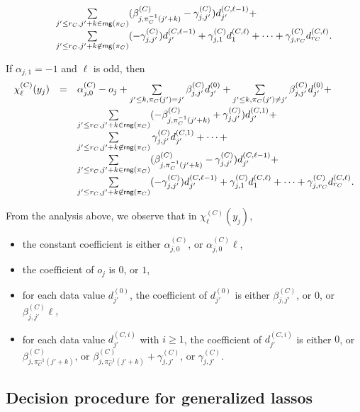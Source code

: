 \documentclass[runningheads,a4paper]{llncs}
\newcommand\rng{\mathsf{rng}}
\begin{document}
\begin{itemize}
{\[\begin{array}{l c l}
%
& & \sum \limits_{j' \le r_C, j'+k \in \rng(\pi_C)} (\beta^{(C)}_{j, \pi_C^{-1}(j'+k)}-\gamma^{(C)}_{j,j'}) d^{(C,\ell-1)}_{j'} + \\
%
& & \sum \limits_{j' \le r_C,  j'+k \not \in \rng(\pi_C)} (-\gamma^{(C)}_{j,j'}) d^{(C,\ell-1)}_{j'} + \gamma^{(C)}_{j, 1} d^{(C,\ell)}_{1} + \dots + \gamma^{(C)}_{j,r_C} d^{(C,\ell)}_{r_C}.
\end{array} 
\]
\item If $\alpha_{j,1}=-1$ and $\ell$ is odd, then
\[
\begin{array}{l c l}
\smallskip
\chi^{(C)}_{\ell}(y_j)  & = &  \alpha^{(C)}_{j,0} - o_j + \sum \limits_{j' \le k, \pi_C(j')=j'} \beta^{(C)}_{j,j'} d^{(0)}_{j'} +  \sum \limits_{j'\le k, \pi_C(j') \neq j'}  \beta^{(C)}_{j,j'} d^{(0)}_{j'} +  \\
%
& & \sum \limits_{j' \le r_C, j'+k \in \rng(\pi_C)} ( -\beta^{(C)}_{j, \pi_C^{-1}(j'+k)} +\gamma^{(C)}_{j,j'}) d^{(C,1)}_{j'} + \\
%
& & \sum \limits_{j' \le r_C,  j'+k \not \in \rng(\pi_C)} \gamma^{(C)}_{j,j'} d^{(C,1)}_{j'} + \dots + \\
%
& & \sum \limits_{j' \le r_C, j'+k \in \rng(\pi_C)} (\beta^{(C)}_{j, \pi_C^{-1}(j'+k)}-\gamma^{(C)}_{j,j'}) d^{(C,\ell-1)}_{j'} + \\
%
& & \sum \limits_{j' \le r_C,  j'+k \not \in \rng(\pi_C)} (-\gamma^{(C)}_{j,j'}) d^{(C,\ell-1)}_{j'} + \gamma^{(C)}_{j, 1} d^{(C,\ell)}_{1} + \dots + \gamma^{(C)}_{j,r_C} d^{(C,\ell)}_{r_C}.
\end{array} 
\]
}
\end{itemize}
%
From the analysis above, we observe that in $\chi^{(C)}_\ell(y_j)$, 
\begin{itemize}
\item the constant coefficient is either $\alpha^{(C)}_{j,0}$, or $\alpha^{(C)}_{j,0} \ell$, 
%
\item the coefficient of $o_j$ is $0$, or $1$, 
%
\item for each data value $d^{(0)}_{j'}$, the coefficient of $d^{(0)}_{j'}$ is either $\beta^{(C)}_{j,j'}$, or $0$, or $\beta^{(C)}_{j,j'} \ell$,
%
\item for each data value $d^{(C,i)}_{j'}$ with $i \ge 1$, the coefficient of $d^{(C,i)}_{j'}$ is either $0$, or $\beta^{(C)}_{j, \pi_C^{-1}(j'+k)}$, or $\beta^{(C)}_{j, \pi_C^{-1}(j'+k)}+\gamma^{(C)}_{j,j'}$, or $\gamma^{(C)}_{j,j'}$.
\end{itemize}


\subsection{Decision procedure for generalized lassos}
\end{document}

